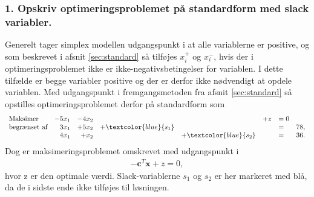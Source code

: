 \subsubsection{1. Opskriv optimeringsproblemet på standardform med slack variabler.}
%
Generelt tager simplex modellen udgangspunkt i at alle variablerne er positive, og som beskrevet i afsnit \ref{sec:standard} så tilføjes $x_i^+$ og $x_i^-$, hvis der i optimeringsproblemet ikke er ikke-negativsbetingelser for variablen. 
I dette tilfælde er begge variabler positive og der er derfor ikke nødvendigt at opdele variablen. 
Med udgangspunkt i fremgangsmetoden fra afsnit \ref{sec:standard} så opstilles optimeringsproblemet derfor på standardform som
%
\begin{align*}
\begin{array}{lrrrrrlr}
\text{Maksimer}		& -5x_1 &-4x_2 &&& + z & =0\\
\text{begrænset af}	&3x_1& +5x_2	& + \textcolor{blue}{s_1} 	&&&= 	&78,\\
					&4x_1& + x_2	& & + \textcolor{blue}{s_2}	&&=	&	 36.\\
\end{array}
\end{align*}
%
Dog er maksimeringsproblemet omskrevet med udgangspunkt i 
\begin{align*}
-\textbf{c}^T\textbf{x} + z	 =0,
\end{align*}
hvor z er den optimale værdi. 
%
Slack-variablerne $s_1$ og $s_2$ er her markeret med blå, da de i sidste ende ikke tilføjes til løsningen. 
%
